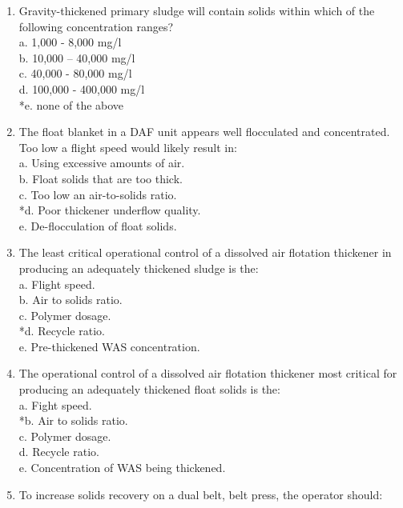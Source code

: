 \documentclass{article}
\begin{document}
\begin{enumerate}
\item  Gravity-thickened primary sludge will contain solids within which of the following concentration ranges? \\

a. 1,000 - 8,000 mg/l \\
b. 10,000 – 40,000 mg/l \\
c. 40,000 - 80,000 mg/l \\
d. 100,000 - 400,000 mg/l \\
*e. none of the above \\

\item  The float blanket in a DAF unit appears well flocculated and concentrated.  Too low a flight speed would likely result in: \\

a. Using excessive amounts of air. \\
b. Float solids that are too thick. \\
c. Too low an air-to-solids ratio. \\
*d. Poor thickener underflow quality. \\
e. De-flocculation of float solids. \\

\item  The least critical operational control of a dissolved air flotation thickener in producing an adequately thickened sludge is the: \\

a. Flight speed. \\
b. Air to solids ratio. \\
c. Polymer dosage. \\
*d. Recycle ratio. \\
e. Pre-thickened WAS concentration. \\

\item  The operational control of a dissolved air flotation thickener most critical for producing an adequately thickened float solids is the: \\

a. Fight speed. \\
*b. Air to solids ratio. \\
c. Polymer dosage. \\
d. Recycle ratio. \\
e. Concentration of WAS being thickened. \\

\item  To increase solids recovery on a dual belt, belt press, the operator should: \\


\end{enumerate}
\end{document}
